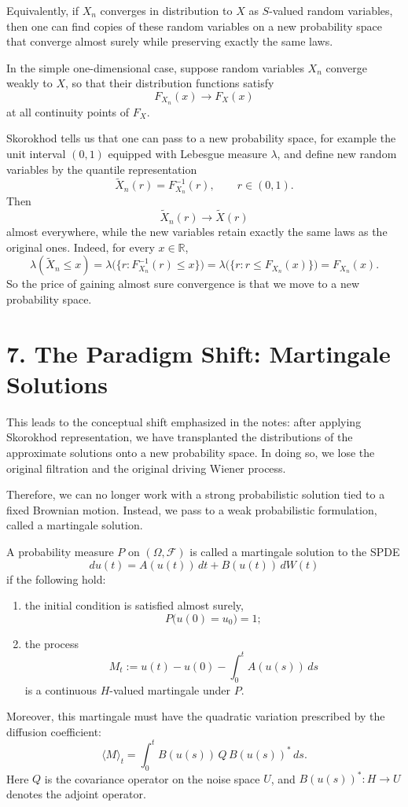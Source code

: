 \documentclass[11pt]{article}
\theoremstyle{definition}
\theoremstyle{remark}
\begin{document}
Equivalently, if $X_n$ converges in distribution to $X$ as $S$-valued random variables, then one can find copies of these random variables on a new probability space that converge almost surely while preserving exactly the same laws.

In the simple one-dimensional case, suppose random variables $X_n$ converge weakly to $X$, so that their distribution functions satisfy
\[
  F_{X_n}(x)\to F_X(x)
\]
at all continuity points of $F_X$.

Skorokhod tells us that one can pass to a new probability space, for example the unit interval $(0,1)$ equipped with Lebesgue measure $\lambda$, and define new random variables by the quantile representation
\[
  \widetilde X_n(r)=F_{X_n}^{-1}(r), \qquad r\in(0,1).
\]
Then
\[
  \widetilde X_n(r)\to \widetilde X(r)
\]
almost everywhere, while the new variables retain exactly the same laws as the original ones. Indeed, for every $x\in\mathbb{R}$,
\[
  \lambda(\widetilde X_n\le x)
  =\lambda\bigl(\{r:F_{X_n}^{-1}(r)\le x\}\bigr)
  =\lambda\bigl(\{r:r\le F_{X_n}(x)\}\bigr)
  =F_{X_n}(x).
\]
So the price of gaining almost sure convergence is that we move to a new probability space.

\section*{7. The Paradigm Shift: Martingale Solutions}
This leads to the conceptual shift emphasized in the notes: after applying Skorokhod representation, we have transplanted the distributions of the approximate solutions onto a new probability space. In doing so, we lose the original filtration and the original driving Wiener process.

Therefore, we can no longer work with a strong probabilistic solution tied to a fixed Brownian motion. Instead, we pass to a weak probabilistic formulation, called a martingale solution.

A probability measure $P$ on $(\Omega,\mathcal F)$ is called a martingale solution to the SPDE
\[
  du(t)=A(u(t))\,dt+B(u(t))\,dW(t)
\]
if the following hold:
\begin{enumerate}
\item the initial condition is satisfied almost surely,
\[
  P\bigl(u(0)=u_0\bigr)=1;
\]
\item the process
\[
  M_t:=u(t)-u(0)-\int_0^t A(u(s))\,ds
\]
is a continuous $H$-valued martingale under $P$.
\end{enumerate}
Moreover, this martingale must have the quadratic variation prescribed by the diffusion coefficient:
\[
  \langle M\rangle_t=\int_0^t B(u(s))\,Q\,B(u(s))^*\,ds.
\]
Here $Q$ is the covariance operator on the noise space $U$, and $B(u(s))^*:H\to U$ denotes the adjoint operator.
\end{document}
